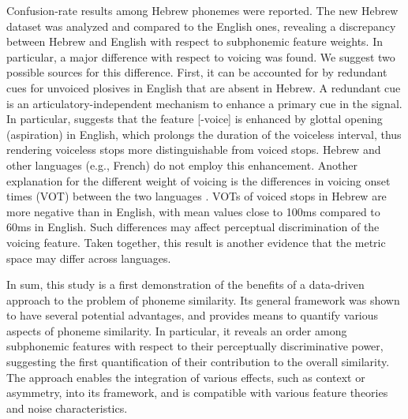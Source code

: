 Confusion-rate results among Hebrew phonemes were reported. The new Hebrew dataset was analyzed and compared to the English ones, revealing a discrepancy between Hebrew and English with respect to subphonemic feature weights. In particular, a major difference with respect to voicing was found. We suggest two possible sources for this difference. First, it can be accounted for by redundant cues for unvoiced plosives in English that are absent in Hebrew. A redundant cue is an articulatory-independent mechanism to enhance a primary cue in the signal. In particular, \citet{stevens1989primary} suggests that the feature [-voice] is enhanced by glottal opening (aspiration) in English, which prolongs the duration of the voiceless interval, thus rendering voiceless stops more distinguishable from voiced stops. Hebrew and other languages (e.g., French) do not employ this enhancement. Another explanation for the different weight of voicing is the differences in voicing onset times (VOT) between the two languages \citep{Laufer1998}. VOTs of voiced stops in Hebrew are more negative than in English, with mean values close to 100ms compared to 60ms in English. Such differences may affect perceptual discrimination of the voicing feature. Taken together, this result is another evidence that the metric space may differ across languages.

In sum, this study is a first demonstration of the benefits of a data-driven approach to the problem of phoneme similarity. Its general framework was shown to have several potential advantages, and provides means to quantify various aspects of phoneme similarity. In particular, it reveals an order among subphonemic features with respect to their perceptually discriminative power, suggesting the first quantification of their contribution to the overall similarity. The approach enables the integration of various effects, such as context or asymmetry, into its framework, and is compatible with various feature theories and noise characteristics.